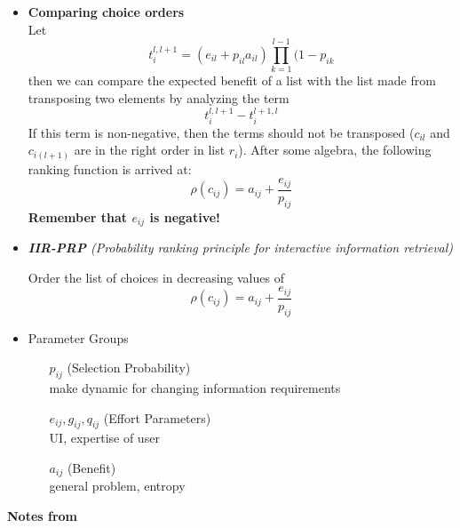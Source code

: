 \documentclass{article}
\newcommand{\note}[1]{{\footnotesize #1}}
\newcommand{\hi}[1]{{\large {\bf #1}}}
\newcommand{\hii}[1]{{\it #1}}
\begin{document}
\begin{itemize}
\item {\bf Comparing choice orders} \\
    Let \[ t_i^{l,l+1} = 
        (e_{il} + p_{il}a_{il})\prod_{k=1}^{l-1}(1-p_{ik} \]
    then we can compare the expected benefit of a list with the list made from transposing two elements by analyzing the term
        \[ t_i^{l,l+1} - t_i^{l+1,l} \]
    If this term is non-negative, then the terms should not be transposed ($c_{il}$ and $c_{i(l+1)}$ are in the right order in list $r_i$).  After some algebra, the following ranking function is arrived at:
        \[ \rho(c_{ij}) = a_{ij} + \frac{e_{ij}}{p_{ij}} \]
    {\bf Remember that $e_{ij}$ is negative!}

\item \hii{{\bf IIR-PRP} (\it Probability ranking principle for interactive information retrieval) }

    Order the list of choices in decreasing values of 
    \[ \rho(c_{ij}) = a_{ij} + \frac{e_{ij}}{p_{ij}} \]

\item Parameter Groups
    \begin{enumerate}
        \item[$p_{ij}$](Selection Probability) \\
            \note{ make dynamic for changing information requirements}
        \item[$e_{ij}, g_{ij}, q_{ij}$](Effort Parameters) \\
            \note{ UI, expertise of user}
        \item[$a_{ij}$](Benefit) \\
            \note{ general problem, entropy}
    \end{enumerate}

\end{itemize}

\hi{Notes from \cite{saracevic07}}
\end{document}

